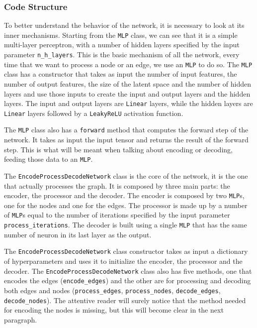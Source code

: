 \documentclass[11pt,a4paper]{article}
\begin{document}
\subsubsection*{Code Structure}
To better understand the behavior of the network, it is necessary to look at its inner mechanisms. 
Starting from the \texttt{MLP} class, we can see that it is a simple multi-layer perceptron, with a number of hidden layers specified by the input parameter \texttt{n\_h\_layers}. This is the basic mechanism of all the network, every time that we want to process a node or an edge, we use an \texttt{MLP} to do so. 
The \texttt{MLP} class has a constructor that takes as input the number of input features, the number of output features, the size of the latent space and the number of hidden layers and use those inputs to create the input and output layers and the hidden layers. The input and output layers are \texttt{Linear} layers, while the hidden layers are \texttt{Linear} layers followed by a \texttt{LeakyReLU} activation function. 

The \texttt{MLP} class also has a \texttt{forward} method that computes the forward step of the network. It takes as input the input tensor and returns the result of the forward step. This is what will be meant when talking about encoding or decoding, feeding those data to an \texttt{MLP}.


The \texttt{EncodeProcessDecodeNetwork} class is the core of the network, it is the one that actually processes the graph. It is composed by three main parts: the encoder, the processor and the decoder. The encoder is composed by two \texttt{MLP}s, one for the nodes and one for the edges. The processor is made up by a number of \texttt{MLP}s equal to the number of iterations specified by the input parameter \texttt{process\_iterations}. The decoder is built using a single \texttt{MLP} that has the same number of neuron in its last layer as the output.

The \texttt{EncodeProcessDecodeNetwork} class constructor takes as input a dictionary of hyperparameters and uses it to initialize the encoder, the processor and the decoder. 
The \texttt{EncodeProcessDecodeNetwork} class also has five methods, one that encodes the edges (\texttt{encode\_edges}) and the other are for processing and decoding both edges and nodes (\texttt{process\_edges}, \texttt{process\_nodes}, \texttt{decode\_edges}, \texttt{decode\_nodes}). The attentive reader will surely notice that the method needed for encoding the nodes is missing, but this will become clear in the next paragraph.
\end{document}
